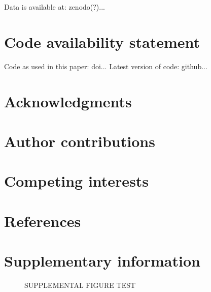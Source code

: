 \documentclass[12pt]{article}
\newcommand{\beginsupplement}{%
        \setcounter{table}{0}
        \renewcommand{\thetable}{S\arabic{table}}%
        \setcounter{figure}{0}
        \renewcommand{\thefigure}{S\arabic{figure}}%
     }
\begin{document}
Data is available at: zenodo(?)...

\section{Code availability statement}

Code as used in this paper: doi...
Latest version of code: github...

\section{Acknowledgments}

\section{Author contributions}




\section{Competing interests}

\section{References}




\section{Supplementary information}
\beginsupplement

\begin{figure}

\caption{SUPPLEMENTAL FIGURE TEST} 
\label{fig:suppTest}
\end{figure}
\end{document}
